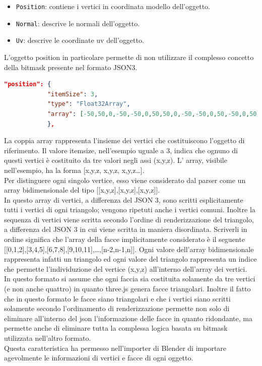 \begin{itemize}
\item \texttt{Position}: contiene i vertici in coordinata modello dell’oggetto.
\item \texttt{Normal}: descrive le normali dell’oggetto.
\item \texttt{Uv}: descrive le coordinate uv dell’oggetto.
\end{itemize}
L’oggetto position in particolare permette di non utilizzare il complesso concetto della bitmask presente nel formato JSON3.
\begin{lstlisting}[language=json]
"position": {
            "itemSize": 3,
            "type": "Float32Array",
            "array": [-50,50,0,-50,-50,0,50,50,0,-50,-50,0,50,-50,0,50,50,0]
            },
\end{lstlisting}
La coppia array rappresenta l’insieme dei vertici che costituiscono l’oggetto di riferimento. 
Il valore itemsize, nell’esempio uguale a 3, indica che ognuno di questi vertici è costituito da tre valori negli assi (x,y,z).
L’ array, visibile nell’esempio, ha la forma [x,y,z,  x,y,z,  x,y,z…].
\\
Per distinguere ogni singolo vertice, esso viene considerato dal parser come un array bidimensionale del tipo [[x,y,z],[x,y,z],[x,y,z]].
\\
In questo array di vertici, a differenza del JSON 3, sono scritti esplicitamente tutti i vertici di ogni triangolo; vengono ripetuti anche  i vertici comuni.
Inoltre la sequenza di vertici viene scritta secondo l’ordine di renderizzazione del triangolo, a differenza del JSON 3 in cui viene scritta in maniera disordinata.
Scriverli in ordine significa che l’array della facce implicitamente considerato è il seguente [[0,1,2],[3,4,5],[6,7,8],[9,10,11],…,[n-2,n-1,n]]. Ogni valore dell’array bidimensionale rappresenta infatti un triangolo ed ogni valore del triangolo rappresenta un indice che permette l’individuzione del vertice (x,y,z) all’interno dell’array dei vertici.
\\
In questo formato si assume che ogni faccia sia costituita solamente da tre vertici (e non anche quattro) in quanto three.js genera facce triangolari.
Inoltre il fatto che in questo formato le facce siano triangolari e che i vertici siano scritti solamente secondo l’ordinamento di renderizzazione permette non solo di eliminare all’interno del json l’informazione delle facce in quanto ridondante, ma permette anche di eliminare tutta la complessa logica basata su bitmask utilizzata nell’altro formato.
\\
Questa caratteristica ha permesso nell’importer di Blender di importare agevolmente le informazioni di vertici e facce di ogni oggetto.

